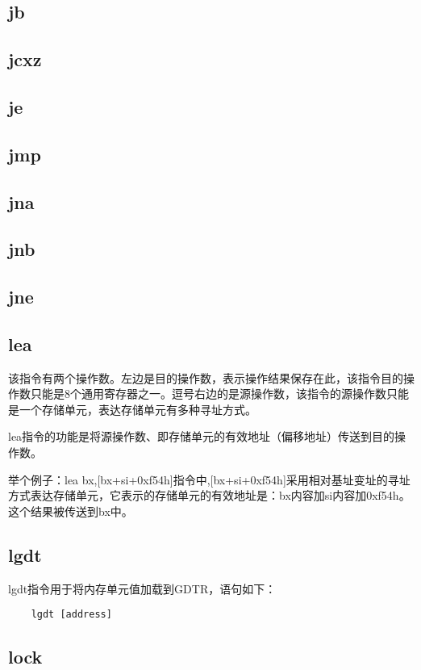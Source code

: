 \documentclass[a4paper,left=2.5cm,right=2.5cm,11pt]{article}
\begin{document}
\subsection{jb}
\subsection{jcxz}
\subsection{je}
\subsection{jmp}
\subsection{jna}
\subsection{jnb}
\subsection{jne}
\subsection{lea}
	该指令有两个操作数。左边是目的操作数，表示操作结果保存在此，该指令目的操作数只能是8个通用寄存器之一。逗号右边的是源操作数，该指令的源操作数只能是一个存储单元，表达存储单元有多种寻址方式。\par

	lea指令的功能是将源操作数、即存储单元的有效地址（偏移地址）传送到目的操作数。\par

	举个例子：lea bx,[bx+si+0xf54h]指令中,[bx+si+0xf54h]采用相对基址变址的寻址方式表达存储单元，它表示的存储单元的有效地址是：bx内容加si内容加0xf54h。这个结果被传送到bx中。

\subsection{lgdt}
	lgdt指令用于将内存单元值加载到GDTR，语句如下：
	\begin{lstlisting}
	lgdt [address]
	\end{lstlisting}

\subsection{lock}
\end{document}
